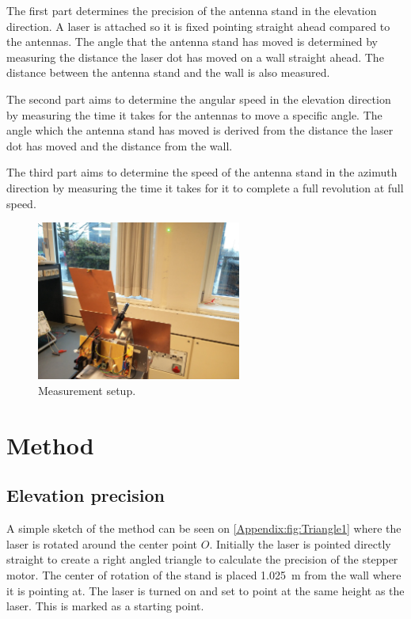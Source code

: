 The first part determines the precision of the antenna stand in the elevation direction. A laser is attached so it is fixed pointing straight ahead compared to the antennas.
The angle that the antenna stand has moved is determined by measuring the distance the laser dot has moved on a wall straight ahead. The distance between the antenna stand and the wall is also measured.

The second part aims to determine the angular speed in the elevation direction by measuring the time it takes for the antennas to move a specific angle. The angle which the antenna stand has moved is derived from the distance the laser dot has moved and the distance from the wall.

The third part aims to determine the speed of the antenna stand in the azimuth direction by measuring the time it takes for it to complete a full revolution at full speed.

\begin{figure} [h]
\centering
\includegraphics[width=0.6\textwidth]{figures/test/DC_motor_speed}
\caption{Measurement setup.}
\label{fig:motor_speed}
\end{figure}


\section*{Method}
\subsection*{Elevation precision}
A simple sketch of the method can be seen on \autoref{Appendix:fig:Triangle1} where the laser is  rotated around the center point $O$. Initially the laser is pointed directly straight to create a right angled triangle to calculate the precision of the stepper motor. The center of rotation of the stand is placed \SI{1.025}{\meter} from the wall where it is pointing at. The laser is turned on and set to point at the same height as the laser. This is marked as a starting point.

